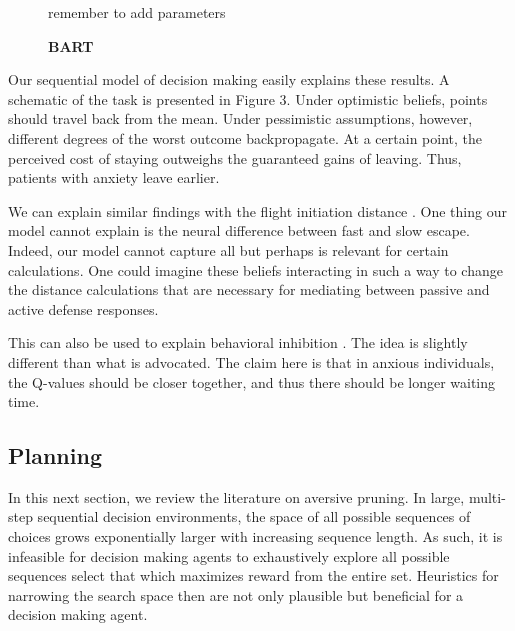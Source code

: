 \documentclass[11pt]{article} %
\begin{document}
\begin{figure}
  \centerline{%
  }
  \caption{\textbf{BART}}
  \par remember to add parameters
\end{figure}

Our sequential model of decision making easily explains these results. A schematic
of the task is presented in Figure 3. Under optimistic beliefs, points should
travel back from the mean. Under pessimistic assumptions, however, different
degrees of the worst outcome backpropagate. At a certain point, the perceived cost
of staying outweighs the guaranteed gains of leaving. Thus, patients with anxiety
leave earlier.

We can explain similar findings with the flight initiation distance \citep{Mobbs2018,
Mobbs2019}. One thing our model cannot explain is the neural difference between
fast and slow escape. Indeed, our model cannot capture all but perhaps is relevant
for certain calculations. One could imagine these beliefs interacting in such a
way to change the distance calculations that are necessary for mediating between
passive and active defense responses.

This can also be used to explain behavioral inhibition \citep{bach2015, khemka2017}.
The idea is slightly different than what is advocated. The claim here is that
in anxious individuals, the Q-values should be closer together, and thus there
should be longer waiting time.

\subsection{Planning}

In this next section, we review the literature on aversive pruning. In large,
multi-step sequential decision environments, the space of all possible sequences
of choices grows exponentially larger with increasing sequence length. As such,
it is infeasible for decision making agents to exhaustively explore all possible
sequences select that which maximizes reward from the entire set. Heuristics for
narrowing the search space then are not only plausible but beneficial for a
decision making agent.
\end{document}
